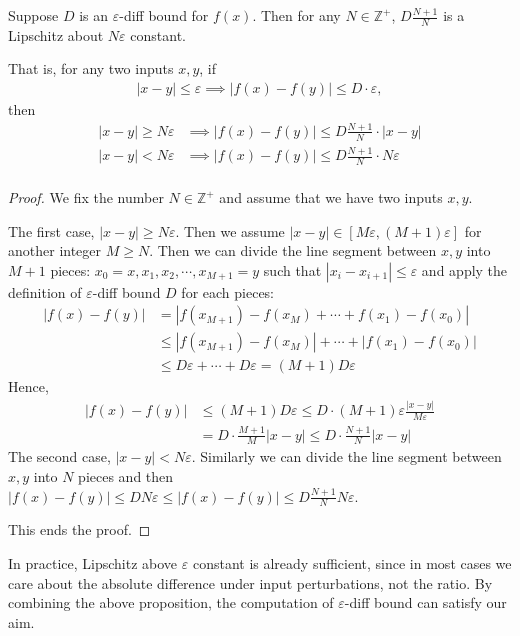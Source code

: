 \documentclass{llncs}
\begin{document}
	
	\begin{proposition}
		
		Suppose $D$ is an $\varepsilon$-diff bound for $f(x)$. Then for any $N\in\mathbb{Z}^+$, $D\frac{N+1}{N}$ is a Lipschitz about $N\varepsilon$ constant.
		
		That is, for any two inputs $x,y$, if \begin{align*}
			|x-y|\leq \varepsilon \implies |f(x)-f(y)| \leq D \cdot \varepsilon,
		\end{align*} then 	 \begin{align*}
			|x-y|\geq N\varepsilon &\implies |f(x)-f(y)| \leq D\frac{N+1}{N} \cdot |x-y|\\
			|x-y|<N\varepsilon &\implies |f(x)-f(y)| \leq D\frac{N+1}{N} \cdot N\varepsilon\\
		\end{align*}
	\end{proposition}
	
	\begin{proof} We fix the number $N\in\mathbb{Z}^+$ and assume that we have two inputs $x, y$.
		
		The first case, $|x-y|\geq N\varepsilon$. Then we assume $|x-y| \in [M\varepsilon ,  (M+1)\varepsilon]$ for another integer $M\geq N$. Then we can divide the line segment between $x, y$ into $M+1$ pieces: $x_0 = x, x_1, x_2, \cdots, x_{M+1} = y$ such that $|x_i-x_{i+1}| \leq \varepsilon$ and apply the definition of $\varepsilon$-diff bound $D$ for each pieces:\begin{align*}
			|f(x)-f(y)| &= |f(x_{M+1})-f(x_M)+\cdots+f(x_1)-f(x_0)|\\
			&\leq |f(x_{M+1})-f(x_M)|+\cdots+|f(x_1)-f(x_0)|\\
			&\leq D\varepsilon + \cdots +D\varepsilon = (M+1)D\varepsilon
		\end{align*}
		Hence,\begin{align*}
			|f(x)-f(y)| &\leq (M+1)D\varepsilon \leq D\cdot (M+1)\varepsilon \frac{|x-y|}{M\varepsilon}\\
			&= D\cdot\frac{M+1}{M} |x-y|	\leq   D\cdot\frac{N+1}{N} |x-y|		
		\end{align*}
		The second case, $|x-y|< N\varepsilon$. Similarly we can divide the line segment between $x, y$ into $N$ pieces and then $|f(x)-f(y)|\leq D N\varepsilon\leq |f(x)-f(y)|\leq D \frac{N+1}{N} N\varepsilon$.
		
		This ends the proof.
	\end{proof}

	In practice, Lipschitz above $\varepsilon$ constant is already sufficient, since in most cases we care about the absolute difference under input perturbations, not the ratio. By combining the above proposition, the computation of $\varepsilon$-diff bound can satisfy our aim.
	
\end{document}
